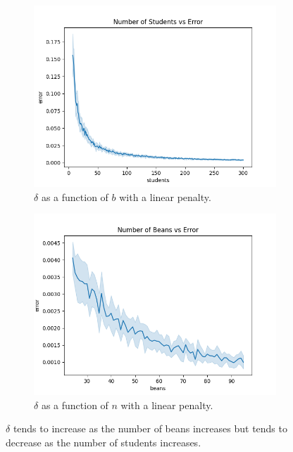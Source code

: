 \documentclass{article}
\begin{document}
\begin{figure}[h]
    \centering
    \begin{subfigure}{0.49\textwidth}
        \centering
        \includegraphics[width=\linewidth]{images/students_error_linear.png}
        \caption{$\delta$ as a function of $b$ with a linear penalty.}
        \label{fig:fig2a}
    \end{subfigure}
    \hfill
    \begin{subfigure}{0.49\textwidth}
        \centering
        \includegraphics[width=\linewidth]{images/beans_error_linear.png}
        \caption{$\delta$ as a function of $n$ with a linear penalty.}
        \label{fig:fig2b}
    \end{subfigure}
    \caption{$\delta$ tends to increase as the number of beans increases but tends to decrease as the number of students increases.}
    \label{fig:fig2}
\end{figure}
\end{document}
